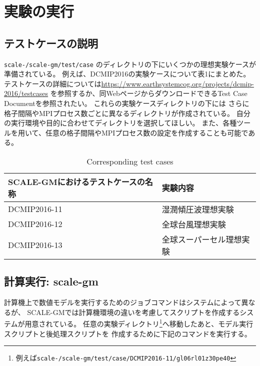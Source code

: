 
\section{実験の実行}
\subsection{テストケースの説明}

\noindent \texttt{scale-{\version}/scale-gm/test/case} のディレクトリの下にいくつかの理想実験ケースが準備されている。
例えば、DCMIP2016の実験ケースについて表1にまとめた。
テストケースの詳細については\url{https://www.earthsystemcog.org/projects/dcmip-2016/testcases}
を参照するか、同WebページからダウンロードできるTest Case Documentを参照されたい。
これらの実験ケースディレクトリの下には
さらに格子間隔やMPIプロセス数ごとに異なるディレクトリが作成されている。
自分の実行環境や目的に合わせてディレクトリを選択してほしい。
また、各種ツールを用いて、任意の格子間隔やMPIプロセス数の設定を作成することも可能である。
 \begin{table}[H]
 \begin{center}
 \caption{Corresponding test cases}
 \begin{tabularx}{150mm}{|l|X|} \hline
 \rowcolor[gray]{0.9} SCALE-GMにおけるテストケースの名称 & 実験内容 \\ \hline
  DCMIP2016-11 & 湿潤傾圧波理想実験  \\ \hline
  DCMIP2016-12 & 全球台風理想実験 \\ \hline
  DCMIP2016-13 & 全球スーパーセル理想実験 \\ \hline
 \end{tabularx}
 \end{center}
 \end{table}


\subsection{計算実行: scale-gm}

計算機上で数値モデルを実行するためのジョブコマンドはシステムによって異なるが、
SCALE-GMでは計算機環境の違いを考慮してスクリプトを作成するシステムが用意されている。
任意の実験ディレクトリ\footnote{例えば\texttt{scale-{\version}/scale-gm/test/case/DCMIP2016-11/gl06rl01z30pe40}}へ移動したあと、モデル実行スクリプトと後処理スクリプトを
作成するために下記のコマンドを実行する。

